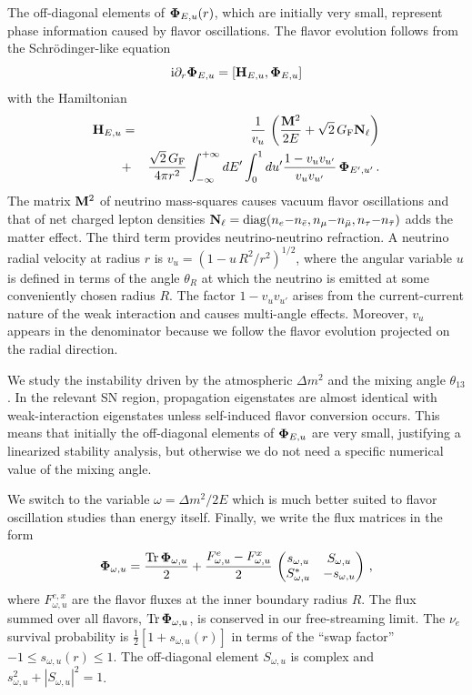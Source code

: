 \documentclass[twocolumn,prd,showpacs,
floatfix,preprintnumbers,nofootinbib]{revtex4}
\begin{document}
The off-diagonal elements of ${\bf\Phi}_{E,u}(r)$, which are
initially very small, represent phase information caused by flavor
oscillations. The flavor evolution follows from the
Schr\"odinger-like equation \cite{EstebanPretel:2008ni}
\begin{equation}
{\rm i}\partial_r{\bf\Phi}_{E,u}=[{\bf H}_{E,u},{\bf\Phi}_{E,u}]
\end{equation}
with the Hamiltonian
\begin{eqnarray}\label{eq:hamiltonian}
{\bf H}_{E,u}&=&\frac{1}{v_{u}}\,\left(\frac{{\bf M}^2}{2E}+
\sqrt{2}\,G_{\rm F}{\bf N}_\ell\right)\\
&+&\frac{\sqrt{2}\,G_{\rm F}}{4\pi r^2}\int_{-\infty}^{+\infty}dE'
\int_0^1 du'
\frac{1-v_{u}v_{u'}}{v_{u}v_{u'}}\,{\bf\Phi}_{E',u'}\,.
\nonumber
\end{eqnarray}
The matrix ${\bf M}^2$ of neutrino mass-squares causes vacuum flavor
oscillations and that of net charged lepton densities ${\bf
N_\ell}={\rm diag}(n_e{-}n_{\bar
e},n_\mu{-}n_{\bar\mu},n_\tau{-}n_{\bar\tau})$ adds the matter
effect. The third term provides neutrino-neutrino refraction. A
neutrino radial velocity at radius $r$ is
$v_u=(1-u\,R^2/r^2)^{1/2}$, where the angular variable $u$ is defined in
terms of the angle $\theta_R$ at which the neutrino is emitted at some 
conveniently chosen radius $R$. The factor $1-v_u v_{u'}$ arises from
the current-current nature of the weak interaction and causes
multi-angle effects. Moreover, $v_u$ appears in the denominator
because we follow the flavor evolution projected on the radial
direction.

We study the instability driven by the atmospheric $\Delta m^2$ and
the mixing angle $\theta_{13}$. In the relevant SN region,
propagation eigenstates are almost identical with weak-interaction
eigenstates unless self-induced flavor conversion occurs. This means
that initially the off-diagonal elements of ${\bf\Phi}_{E,u}$ are
very small, justifying a linearized stability analysis, but
otherwise we do not need a specific numerical value of the mixing
angle.

We switch to the variable $\omega=\Delta m^2/2E$ which is much
better suited to flavor oscillation studies than energy itself.
Finally, we write the flux matrices in the form
\begin{equation}
{\bf\Phi}_{\omega,u}=\frac{{\rm Tr}\,{\bf\Phi}_{\omega,u}}{2}
+\frac{F_{\omega,u}^e-F_{\omega,u}^x}{2}\,
\begin{pmatrix}
s_{\omega,u}&S_{\omega,u}\\
S_{\omega,u}^*&-s_{\omega,u}
\end{pmatrix}\,,
\end{equation}
where $F_{\omega,u}^{e,x}$ are the flavor fluxes at the inner
boundary radius $R$. The flux summed over all flavors, ${\rm
Tr}\,{\bf\Phi}_{\omega,u}$, is conserved in our free-streaming
limit. The $\nu_e$ survival probability is
$\frac{1}{2}[1+s_{\omega,u}(r)]$ in terms of the ``swap factor''
$-1\leq s_{\omega,u}(r)\leq1$. The off-diagonal element
$S_{\omega,u}$ is complex and $s^2_{\omega,u}+|S_{\omega,u}|^2=1$.
\end{document}
